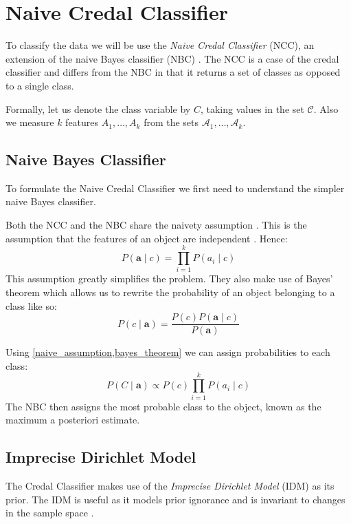 \chapter{Naive Credal Classifier}
To classify the data we will be use the \textit{Naive Credal Classifier} (NCC), an extension of the naive Bayes classifier (NBC) \cite{Zaffalon01}. The NCC is a case of the credal classifier and differs from the NBC in that it returns a set of classes as opposed to a single class.

Formally, let us denote the class variable by $C$, taking values in the set $\mathcal{C}$. Also we measure $\mathit{k}$ features $A_1,\dots,A_k$ from the sets $\mathcal{A}_1,\dots,\mathcal{A}_k$.

\section{Naive Bayes Classifier}
To formulate the Naive Credal Classifier we first need to understand the simpler naive Bayes classifier.

Both the NCC and the NBC share the naivety assumption \cite{Zaffalon01}. This is the assumption that the features of an object are independent \cite{Rish01}. Hence:
\begin{equation} \label{naive_assumption}
	P(\mathbf{a} \mid c) = \prod_{i=1}^{k} P(a_i \mid c)
\end{equation}
This assumption greatly simplifies the problem. They also make use of Bayes' theorem which allows us to rewrite the probability of an object belonging to a class like so:
\begin{equation} \label{bayes_theorem}
    P(c \mid \mathbf{a}) = \frac{P(c) P(\mathbf{a} \mid c)}{P(\mathbf{a})}
\end{equation}

Using \cref{naive_assumption,bayes_theorem} we can assign probabilities to each class:
\begin{equation}
    P(C \mid \mathbf{a}) \propto P(c) \prod_{i=1}^k P(a_i \mid c)
\end{equation}
The NBC then assigns the most probable class to the object, known as the maximum a posteriori estimate.

\section{Imprecise Dirichlet Model}

The Credal Classifier makes use of the \textit{Imprecise Dirichlet Model} (IDM) as its prior. The IDM is useful as it models prior ignorance and is invariant to changes in the sample space \cite{Bernard04}.

